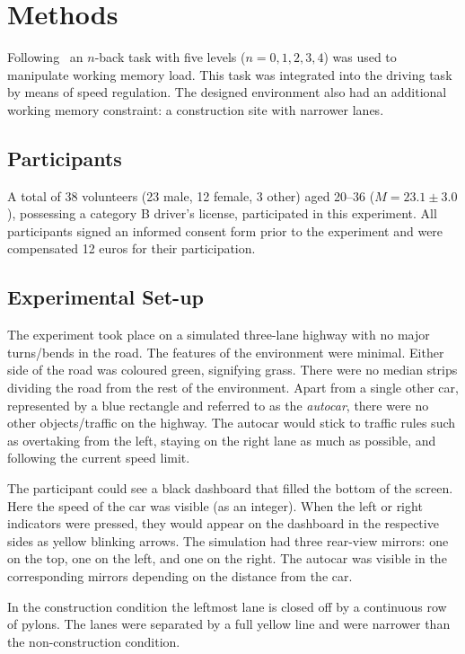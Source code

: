 
\section{Methods}\label{sec:methods}
Following~\cite{Unni2017} an \(n\)-back task with five levels (\(n = 0,1,2,3,4\)) was used to manipulate working memory load. 
This task was integrated into the driving task by means of speed regulation. 
The designed environment also had an additional working memory constraint: a construction site with narrower lanes.  

\subsection{Participants}
A total of 38 volunteers (23 male, 12 female, 3 other) aged 20--36 (\(M = 23.1 \pm 3.0\)), possessing a category B driver's license, participated in this experiment. 
All participants signed an informed consent form prior to the experiment and were compensated 12 euros for their participation.

\subsection{Experimental Set-up}
The experiment took place on a simulated three-lane highway with no major turns/bends in the road. 
The features of the environment were minimal. 
Either side of the road was coloured green, signifying grass. 
There were no median strips dividing the road from the rest of the environment. 
Apart from a single other car, represented by a blue rectangle and referred to as the \textit{autocar}, there were no other objects/traffic on the highway. 
The autocar would stick to traffic rules such as overtaking from the left, staying on the right lane as much as possible, and following the current speed limit. 

The participant could see a black dashboard that filled the bottom of the screen. 
Here the speed of the car was visible (as an integer). 
When the left or right indicators were pressed, they would appear on the dashboard in the respective sides as yellow blinking arrows. 
The simulation had three rear-view mirrors: one on the top, one on the left, and one on the right. 
The autocar was visible in the corresponding mirrors depending on the distance from the car. 

In the construction condition the leftmost lane is closed off by a continuous row of pylons. 
The lanes were separated by a full yellow line and were narrower than the non-construction condition. 

